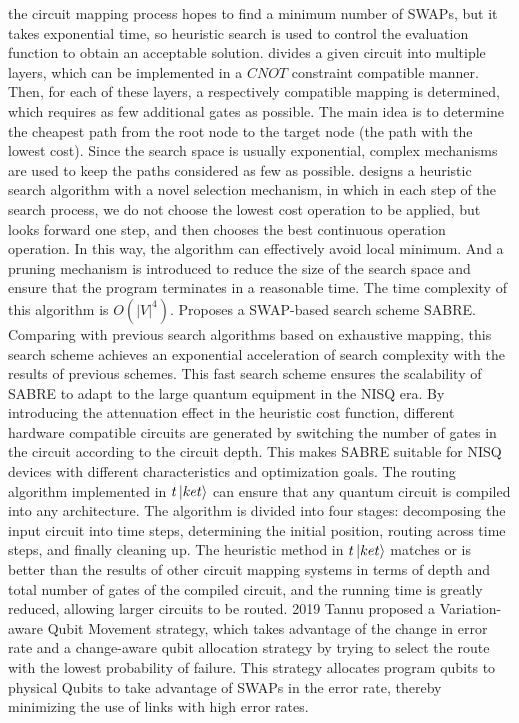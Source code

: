 \documentclass[runningheads]{llncs}
\begin{document}
the circuit mapping process hopes to find a minimum number of SWAPs, 
but it takes exponential time, 
so heuristic search is used to control the evaluation function 
to obtain an acceptable solution.
\cite{Zulehner2017} divides a given circuit into multiple layers, 
which can be implemented in a $CNOT$ 
constraint compatible manner. Then, for each of these layers, 
a respectively compatible mapping is determined, 
which requires as few additional gates as possible. 
The main idea is to determine the cheapest path from the root node to the target node 
(the path with the lowest cost). Since the search space is usually exponential, 
complex mechanisms are used to keep the paths considered as few as possible.
\cite{Xiangzhen2020} designs a heuristic search algorithm with a novel selection mechanism, 
in which in each step of the search process, we do not choose the lowest cost operation to be applied, 
but looks forward one step, and then chooses the best continuous operation operation. 
In this way, the algorithm can effectively avoid local minimum. And a pruning mechanism is introduced 
to reduce the size of the search space and ensure that the program terminates in a reasonable time. 
The time complexity of this algorithm is $O(|V|^{4})$.
\cite{Li2018} Proposes a SWAP-based search scheme SABRE. 
Comparing with previous search algorithms based on exhaustive mapping, 
this search scheme achieves an exponential acceleration of search complexity 
with the results of previous schemes.
This fast search scheme ensures the scalability of SABRE to adapt to the large 
quantum equipment in the NISQ era.
By introducing the attenuation effect in the heuristic cost function, 
different hardware compatible circuits are generated by switching the number 
of gates in the circuit according to the circuit depth.
This makes SABRE suitable for NISQ devices with different characteristics and optimization goals.
The routing algorithm implemented in $t\left\vert{ket}\right\rangle$\cite{Cowtan2019} can ensure 
that any quantum circuit is compiled into any architecture.
The algorithm is divided into four stages: 
decomposing the input circuit into time steps, 
determining the initial position, 
routing across time steps, and finally cleaning up.
The heuristic method in $t\left\vert{ket}\right\rangle$ matches or is better than the results of 
other circuit mapping systems in terms of depth and total number of gates of 
the compiled circuit, and the running time is greatly reduced, allowing larger circuits to be routed.
2019 Tannu \cite{Tannu2019} proposed a Variation-aware Qubit Movement strategy, 
which takes advantage of the change in error rate and a change-aware qubit allocation 
strategy by trying to select the route with the lowest probability of failure. 
This strategy allocates program qubits to physical Qubits to take advantage 
of SWAPs in the error rate, thereby minimizing the use of links with high error rates.
\end{document}

